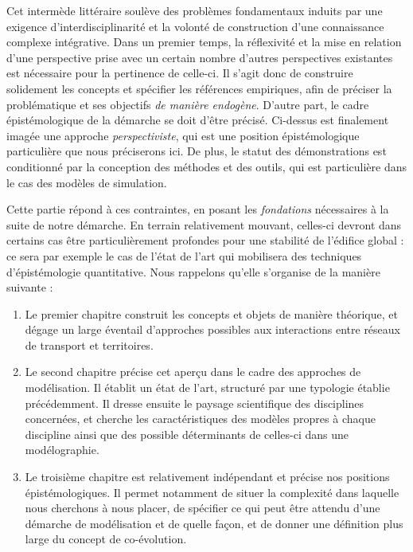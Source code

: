 \bigskip



Cet intermède littéraire soulève des problèmes fondamentaux induits par une exigence d'interdisciplinarité et la volonté de construction d'une connaissance complexe intégrative. Dans un premier temps, la réflexivité et la mise en relation d'une perspective prise avec un certain nombre d'autres perspectives existantes est nécessaire pour la pertinence de celle-ci. Il s'agit donc de construire solidement les concepts et spécifier les références empiriques, afin de préciser la problématique et ses objectifs \emph{de manière endogène}. D'autre part, le cadre épistémologique de la démarche se doit d'être précisé. Ci-dessus est finalement imagée une approche \emph{perspectiviste}, qui est une position épistémologique particulière que nous préciserons ici. De plus, le statut des démonstrations est conditionné par la conception des méthodes et des outils, qui est particulière dans le cas des modèles de simulation.


Cette partie répond à ces contraintes, en posant les \emph{fondations} nécessaires à la suite de notre démarche. En terrain relativement mouvant, celles-ci devront dans certains cas être particulièrement profondes pour une stabilité de l'édifice global : ce sera par exemple le cas de l'état de l'art qui mobilisera des techniques d'épistémologie quantitative. Nous rappelons qu'elle s'organise de la manière suivante :
\begin{enumerate}
	\item Le premier chapitre construit les concepts et objets de manière théorique, et dégage un large éventail d'approches possibles aux interactions entre réseaux de transport et territoires.
	\item Le second chapitre précise cet aperçu dans le cadre des approches de modélisation. Il établit un état de l'art, structuré par une typologie établie précédemment. Il dresse ensuite le paysage scientifique des disciplines concernées, et cherche les caractéristiques des modèles propres à chaque discipline ainsi que des possible déterminants de celles-ci dans une modélographie.
	\item Le troisième chapitre est relativement indépendant et précise nos positions épistémologiques. Il permet notamment de situer la complexité dans laquelle nous cherchons à nous placer, de spécifier ce qui peut être attendu d'une démarche de modélisation et de quelle façon, et de donner une définition plus large du concept de co-évolution.
\end{enumerate}




